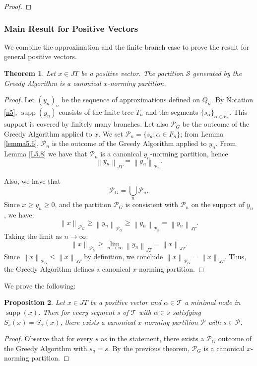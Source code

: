 \documentclass[11pt,a4paper]{amsart}
\newtheorem{theorem}{Theorem}[section]
\newtheorem{proposition}[theorem]{Proposition}
\newcommand{\JT}{JT}
\newcommand{\Tree}{\mathcal{T}}
\newcommand{\norm}[1]{\left\lVert#1\right\rVert}
\newcommand{\supp}{\operatorname{supp}}
\begin{document}
\begin{proof}
    \end{proof}
      
\subsubsection{Main Result for Positive Vectors}

We combine the approximation and the finite branch case to prove the result for general positive vectors.

\begin{theorem}\label{T5.9}
    Let $x \in \JT$ be a positive vector. The partition $\mathcal{S}$ generated by the Greedy Algorithm is a canonical $x$-norming partition.
\end{theorem}

\begin{proof}
    Let $(y_n)_n$ be the sequence of approximations defined on $Q_n$.
    By Notation \ref{n5}, $\supp(y_n)$ consists of the finite tree $T_n$ and the segments $\{s_\alpha\}_{\alpha \in F_n}$. This support is covered by finitely many branches. Let also $\mathcal{P}_G$ be the outcome of the Greedy Algorithm applied to $x$. We set $\mathcal{P}_n = \{ s_a : \alpha \in F_n\}$; from 
    Lemma \ref{lemma5.6}, $\mathcal{P}_n$ is the outcome of the Greedy Algorithm applied to $y_n$. From Lemma \ref{L5.8} we have that $\mathcal{P}_n$ is a canonical $y_n$-norming partition, hence
    \[ \norm{y_n}_{\JT} = \norm{y_n}_{\mathcal{P}_n}. \]
    
    Also, we have that
    \[ \mathcal{P}_G = \bigcup_n \mathcal{P}_n. \]
    Since $x \ge y_n \ge 0$, and the partition $\mathcal{P}_G$ is consistent with $\mathcal{P}_n$ on the support of $y_n$, we have:
    \[ \norm{x}_{\mathcal{P}_G} \ge \norm{y_n}_{\mathcal{P}_G} \ge \norm{y_n}_{\mathcal{P}_n} = \norm{y_n}_{\JT}. \]
    Taking the limit as $n \to \infty$:
    \[ \norm{x}_{\mathcal{P}_G} \ge \lim_{n \to \infty} \norm{y_n}_{\JT} = \norm{x}_{\JT}. \]
    Since $\norm{x}_{\mathcal{P}_G} \le \norm{x}_{\JT}$ by definition, we conclude $\norm{x}_{\mathcal{P}_G} = \norm{x}_{\JT}$.
    Thus, the Greedy Algorithm defines a canonical $x$-norming partition.
\end{proof}
We prove the following:
\begin{proposition}\label{Prop.5.10}
    Let $x\in \JT$ be a positive vector and $\alpha \in \Tree$ a minimal node in $\supp(x)$. Then for every segment $s$ of $\Tree$ with $\alpha \in s$ satisfying $ S_s(x) = S_\alpha(x)$, there exists a canonical $x$-norming partition $\mathcal{P}$ with $s\in \mathcal{P}$.
\end{proposition}
\begin{proof}
    Observe that for every $s$ as in the statement, there exists a $\mathcal{P}_G$ outcome of the Greedy Algorithm with $s_a = s$. By the previous theorem, $\mathcal{P}_G$ is a canonical $x$-norming partition.
\end{proof}
\end{document}
